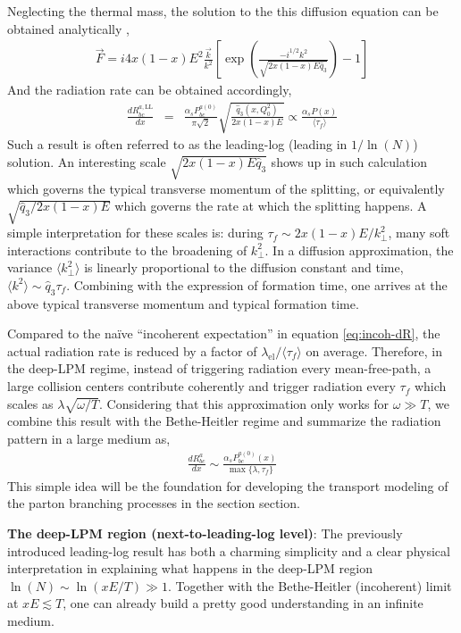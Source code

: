 Neglecting the thermal mass, the solution to the this diffusion equation can be obtained analytically \cite{Arnold:2008zu},
\begin{eqnarray}
\vec{F} = i 4x(1-x)E^2 \frac{\vec{k}}{k^2} \left[\exp\left(\frac{-i^{1/2}k^2}{\sqrt{2x(1-x)E\hat{q}_3}}\right)-1\right]
\end{eqnarray}
And the radiation rate can be obtained accordingly,
\begin{eqnarray}\label{eq:AMY-LL}
\frac{dR_{bc}^{a,\textrm{LL}}}{dx} &=& \frac{\alpha_s P_{bc}^{a(0)}}{\pi\sqrt{2}}
\sqrt{\frac{\hat{q}_3(x, Q_0^2)}{2x(1-x)E}} \propto \frac{\alpha_s P(x)}{\langle \tau_f \rangle}
\end{eqnarray}
Such a result is often referred to as the leading-log (leading in $1/\ln(N)$) solution.
An interesting scale $\sqrt{2x(1-x)E\hat{q}_3}$ shows up in such calculation which governs the typical transverse momentum of the splitting, or equivalently $\sqrt{\hat{q}_3/2x(1-x)E}$ which governs the rate at which the splitting happens.
A simple interpretation for these scales is:
during $\tau_f \sim 2x(1-x)E/k_\perp^2$, many soft interactions contribute to the broadening of $k_\perp^2$.
In a diffusion approximation, the variance $\langle k_\perp^2 \rangle$ is linearly proportional to the diffusion constant and time, $\langle k^2\rangle \sim \hat{q}_3\tau_f$.
Combining with the expression of formation time, one arrives at the above typical transverse momentum and typical formation time.

Compared to the na\"ive ``incoherent expectation'' in equation \ref{eq:incoh-dR}, the actual radiation rate is reduced by a factor of $\lambda_{\textrm{el}}/\langle \tau_f \rangle$ on average. 
Therefore, in the deep-LPM regime, instead of triggering radiation every mean-free-path, a large collision centers contribute coherently and trigger radiation every $\tau_f$ which scales as $\lambda \sqrt{\omega/T}$.
Considering that this approximation only works for $\omega \gg T$, we combine this result with the Bethe-Heitler regime and summarize the radiation pattern in a large medium as,
\begin{eqnarray}
\frac{dR^a_{bc}}{dx} \sim \frac{\alpha_s P^{a(0)}_{bc}(x)}{\max\{\lambda, \tau_f\}}
\end{eqnarray}
This simple idea will be the foundation for developing the transport modeling of the parton branching processes in the section section.

{\bf The deep-LPM region (next-to-leading-log level)}:
The previously introduced leading-log result has both a charming simplicity and a clear physical interpretation in explaining what happens in the deep-LPM region $\ln(N) \sim \ln(xE/T) \gg 1$.
Together with the Bethe-Heitler (incoherent) limit at $xE \lesssim T$, one can already build a pretty good understanding in an infinite medium.

